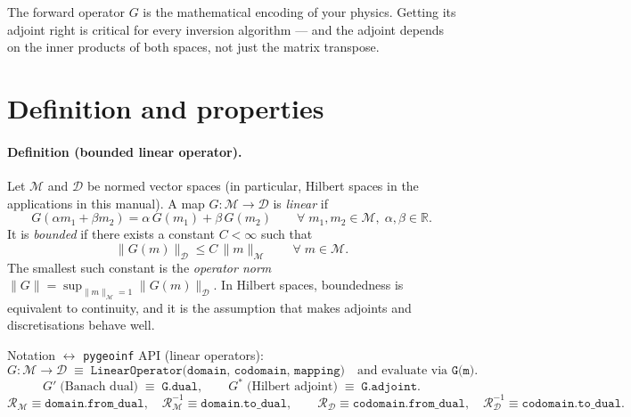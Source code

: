 \documentclass[11pt,twoside,openright]{book}
\theoremstyle{plain}
\theoremstyle{definition}
\theoremstyle{remark}
\newcommand{\modelspace}{\mathcal{M}}
\newcommand{\dataspace}{\mathcal{D}}
\newcommand{\Riesz}{\mathcal{R}}
\begin{document}
\begin{whybox}
The forward operator $G$ is the mathematical encoding of your physics.
Getting its adjoint right is critical for every inversion algorithm ---
and the adjoint depends on the inner products of both spaces, not just
the matrix transpose.
\end{whybox}

\section{Definition and properties}
\label{sec:operator-definition}

\paragraph{Definition (bounded linear operator).}
Let $\modelspace$ and $\dataspace$ be normed vector spaces (in particular,
Hilbert spaces in the applications in this manual). A map
$G: \modelspace \to \dataspace$ is \emph{linear} if
\begin{equation}
  G(\alpha m_1 + \beta m_2) = \alpha\,G(m_1) + \beta\,G(m_2)
  \qquad \forall\; m_1,m_2\in\modelspace,\; \alpha,\beta\in\mathbb{R}.
\end{equation}
It is \emph{bounded} if there exists a constant $C < \infty$ such that
\begin{equation}
  \label{eq:bounded-linear-operator}
  \|G(m)\|_{\dataspace} \le C\,\|m\|_{\modelspace}
  \qquad \forall\; m\in\modelspace.
\end{equation}
The smallest such constant is the \emph{operator norm}
$\|G\| = \sup_{\|m\|_{\modelspace}=1} \|G(m)\|_{\dataspace}$.
In Hilbert spaces, boundedness is equivalent to continuity, and it is the
assumption that makes adjoints and discretisations behave well.

\begin{codebox}
Notation \(\leftrightarrow\) \texttt{pygeoinf} API (linear operators):
\[
  G: \modelspace \to \dataspace
  \;\equiv\;
  \texttt{LinearOperator(domain, codomain, mapping)}
  \quad \text{and evaluate via } \texttt{G(m)}.
\]
\[
  G'\;\text{(Banach dual)} \;\equiv\; \texttt{G.dual},
  \qquad
  G^*\;\text{(Hilbert adjoint)} \;\equiv\; \texttt{G.adjoint}.
\]
\[
  \Riesz_{\modelspace} \equiv \texttt{domain.from\_dual},\quad
  \Riesz_{\modelspace}^{-1} \equiv \texttt{domain.to\_dual},
  \qquad
  \Riesz_{\dataspace} \equiv \texttt{codomain.from\_dual},\quad
  \Riesz_{\dataspace}^{-1} \equiv \texttt{codomain.to\_dual}.
\]
\end{codebox}
\end{document}
